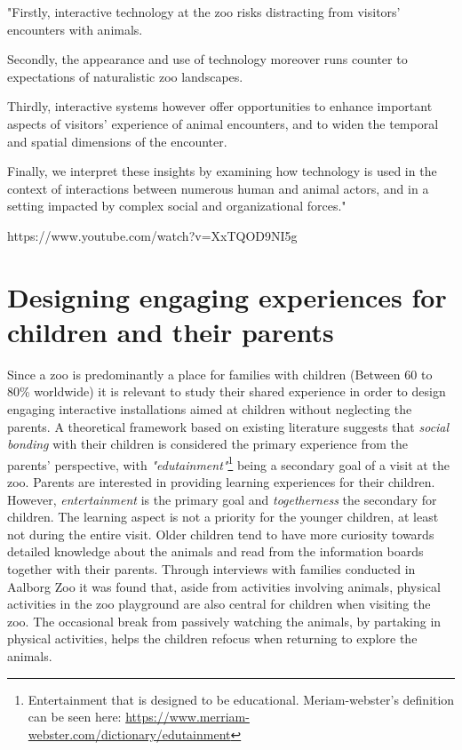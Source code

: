 "Firstly, interactive technology at the zoo risks distracting from visitors' encounters with animals.

Secondly, the appearance and use of technology moreover runs counter to expectations of naturalistic zoo landscapes. 

Thirdly, interactive systems however offer opportunities to enhance important aspects of visitors' experience of animal encounters, and to widen the temporal and spatial dimensions of the encounter. 

Finally, we interpret these insights by examining how technology is used in the context of interactions between numerous human and animal actors, and in a setting impacted by complex social and organizational forces."

https://www.youtube.com/watch?v=XxTQOD9NI5g

\section{Designing engaging experiences for children and their parents}
Since a zoo is predominantly a place for families with children (Between 60 to 80\% worldwide)\cite{togetherAtTheZoo} it is relevant to study their shared experience in order to design engaging interactive installations aimed at children without neglecting the parents.
A theoretical framework based on existing literature suggests that \textit{social bonding} with their children is considered the primary experience from the parents' perspective, with \textit{"edutainment"}\footnote{Entertainment that is designed to be educational. Meriam-webster's definition can be seen here: \url{https://www.merriam-webster.com/dictionary/edutainment}} being a secondary goal of a visit at the zoo. Parents are interested in providing learning experiences for their children. However, \textit{entertainment} is the primary goal and \textit{togetherness} the secondary for children\cite{togetherAtTheZoo}. The learning aspect is not a priority for the younger children, at least not during the entire visit. Older children tend to have more curiosity towards detailed knowledge about the animals and read from the information boards together with their parents\cite{togetherAtTheZoo}. Through interviews with families conducted in Aalborg Zoo it was found that, aside from activities involving animals, physical activities in the zoo playground are also central for children when visiting the zoo. The occasional break from passively watching the animals, by partaking in physical activities, helps the children refocus when returning to explore the animals\cite{togetherAtTheZoo}.

